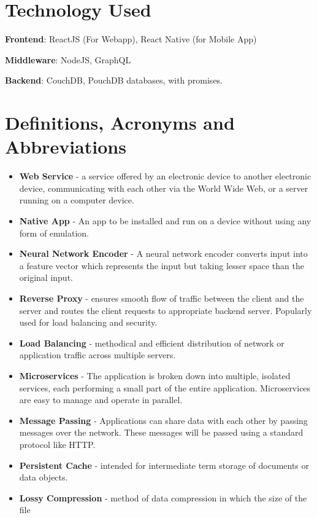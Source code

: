 \section{Technology Used}

\textbf{Frontend}: ReactJS (For Webapp), React Native (for Mobile App)

\textbf{Middleware}: NodeJS, GraphQL

\textbf{Backend}: CouchDB, PouchDB databases, with promises.

\section{Definitions, Acronyms and Abbreviations}

\begin{itemize}
    \item \textbf{Web Service} - a service offered by an electronic device to another electronic device, 
    communicating with each other via the World Wide Web, or a server running on a computer device.
    \item \textbf{Native App} - An app to be installed and run on a device without using any form of emulation.
    \item \textbf{Neural Network Encoder} - A neural network encoder converts input into a feature vector 
    which represents the input but taking lesser space than the original input.
    \item \textbf{Reverse Proxy} - ensures smooth flow of traffic between the client and the server 
    and routes the client requests to appropriate backend server. Popularly used for load balancing and security.
    \item \textbf{Load Balancing} - methodical and efficient distribution of network or application traffic 
    across multiple servers.
    \item \textbf{Microservices} - The application is broken down into multiple, isolated services, each performing 
    a small part of the entire application. Microservices are easy to manage and operate in parallel.
    \item \textbf{Message Passing} - Applications can share data with each other by passing messages over the network. 
    These messages will be passed using a standard protocol like HTTP.
    \item \textbf{Persistent Cache} - intended for intermediate term storage of documents or data objects.
    \item \textbf{Lossy Compression} - method of data compression in which the size of the file 

\end{itemize}
